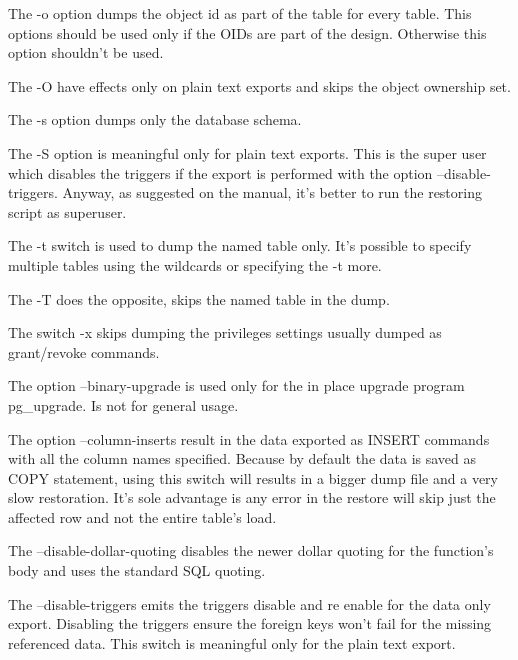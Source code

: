 The -o option dumps the object id as part of the table for every table. This options should be 
used only if the OIDs are part of the design. Otherwise this option shouldn't be used.\newline

The -O have effects only on plain text exports and skips the object ownership set.\newline

The -s option dumps only the database schema.\newline


The -S option is meaningful only for plain text exports. This is the super user which disables the 
triggers if the export is performed with the option --disable-triggers. Anyway, as suggested on the 
manual, it's better to run the restoring script as superuser.\newline

The -t switch is used to dump the named table only. It's possible to specify multiple tables using 
the wildcards or specifying the -t more.\newline

The -T does the opposite, skips the named table in the dump.\newline

The switch -x skips dumping the privileges settings usually dumped as grant/revoke commands.\newline

The option --binary-upgrade is used only for the in place upgrade program pg\_upgrade. Is not 
for general usage. 


The option --column-inserts result in the data exported as INSERT commands with all the column 
names specified. Because by default the data is saved as COPY statement, using this switch will 
results in a bigger dump file and a very slow restoration. It's sole advantage is any error in the 
restore will skip just the affected row and not the entire table's load.\newline

The --disable-dollar-quoting disables the newer dollar quoting for the function's body and uses the 
standard SQL quoting.\newline

The --disable-triggers emits the triggers disable 
and re enable for the data only export. Disabling the triggers ensure the foreign keys won't fail 
for the missing referenced data. This switch is meaningful only for the plain text export.\newline

